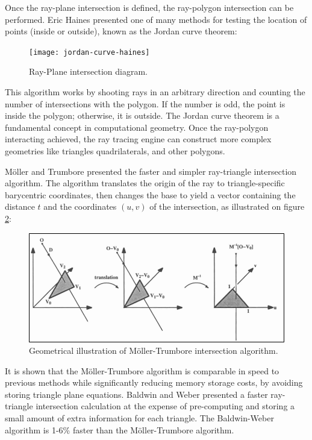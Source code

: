 \documentclass[12pt,a4paper,english]{article}
\begin{document}
Once the ray-plane intersection is defined, the ray-polygon intersection can be performed. Eric Haines presented \cite{Haines_1989} one of many methods for testing the location of points (inside or outside), known as the Jordan curve theorem:

\begin{figure}[H]
    \centering
    \texttt{[image: jordan-curve-haines]}
    \caption[]{Ray-Plane intersection diagram.}
    \label{fig:jordan-curve-haines}
\end{figure}

This algorithm works by shooting rays in an arbitrary direction and counting the number of intersections with the polygon. If the number is odd, the point is inside the polygon; otherwise, it is outside. The Jordan curve theorem is a fundamental concept in computational geometry. Once the ray-polygon interacting achieved, the ray tracing engine can construct more complex geometries like triangles quadrilaterals, and other polygons.

Möller and Trumbore presented \cite{Möller_Trumbore_1997} the faster and simpler ray-triangle intersection algorithm. The algorithm translates the origin of the ray to triangle-specific barycentric coordinates, then changes the base to yield a vector containing the distance $t$ and the coordinates $(u,v)$ of the intersection, as illustrated on figure \ref{fig:moller_trumbore_algorithm}:

\begin{figure}[H]
    \centering
    \includegraphics[width=1.0\textwidth]{moller_trumbore_algorithm}
    \caption[Geometrical illustration of Möller-Trumbore intersection algorithm]{Geometrical illustration of Möller-Trumbore intersection algorithm.}
    \label{fig:moller_trumbore_algorithm}
\end{figure}

It is shown that the Möller-Trumbore algorithm is comparable in speed to previous methods while significantly reducing memory storage costs, by avoiding storing triangle plane equations. Baldwin and Weber presented \cite{Baldwin_Weber_2016} a faster ray-triangle intersection calculation at the expense of pre-computing and storing a small amount of extra information for each triangle. The Baldwin-Weber algorithm is 1-6\% faster than the Möller-Trumbore algorithm.
\end{document}
